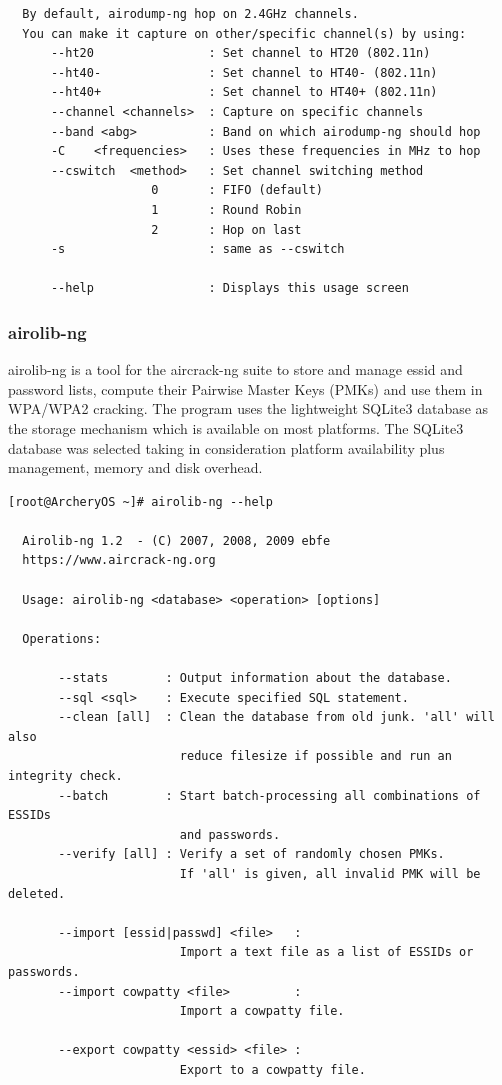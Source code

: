 \documentclass{article}
\begin{document}
\begin{lstlisting}
  By default, airodump-ng hop on 2.4GHz channels.
  You can make it capture on other/specific channel(s) by using:
      --ht20                : Set channel to HT20 (802.11n)
      --ht40-               : Set channel to HT40- (802.11n)
      --ht40+               : Set channel to HT40+ (802.11n)
      --channel <channels>  : Capture on specific channels
      --band <abg>          : Band on which airodump-ng should hop
      -C    <frequencies>   : Uses these frequencies in MHz to hop
      --cswitch  <method>   : Set channel switching method
                    0       : FIFO (default)
                    1       : Round Robin
                    2       : Hop on last
      -s                    : same as --cswitch

      --help                : Displays this usage screen
\end{lstlisting}

\subsubsection{airolib-ng}
airolib-ng  is  a tool for the aircrack-ng suite to store and manage essid and password lists, compute their Pairwise Master Keys (PMKs) and use them in WPA/WPA2 cracking. The program uses the lightweight SQLite3 database as the storage mechanism which is available on most  platforms.  The  SQLite3 database was  selected taking in consideration platform availability plus management, memory and disk overhead.
\begin{lstlisting}
[root@ArcheryOS ~]# airolib-ng --help

  Airolib-ng 1.2  - (C) 2007, 2008, 2009 ebfe
  https://www.aircrack-ng.org

  Usage: airolib-ng <database> <operation> [options]

  Operations:

       --stats        : Output information about the database.
       --sql <sql>    : Execute specified SQL statement.
       --clean [all]  : Clean the database from old junk. 'all' will also 
                        reduce filesize if possible and run an integrity check.
       --batch        : Start batch-processing all combinations of ESSIDs
                        and passwords.
       --verify [all] : Verify a set of randomly chosen PMKs.
                        If 'all' is given, all invalid PMK will be deleted.

       --import [essid|passwd] <file>   :
                        Import a text file as a list of ESSIDs or passwords.
       --import cowpatty <file>         :
                        Import a cowpatty file.

       --export cowpatty <essid> <file> :
                        Export to a cowpatty file.
\end{lstlisting}
\end{document}
